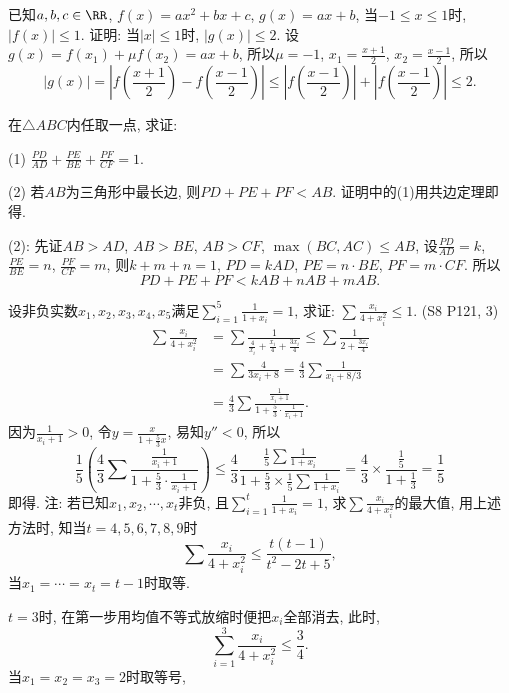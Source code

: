 \bq{}{}
已知$a,b,c\in\RR$, $f\left(x\right)=ax^{2}+bx+c$, $g\left(x\right)=ax+b$,
当$-1\le x\le1$时, $\left|f\left(x\right)\right|\le1$. 证明: 当$\left|x\right|\le1$时,
$\left|g\left(x\right)\right|\le2$.
\eq
\ba
设$g\left(x\right)=f\left(x_{1}\right)+\mu f\left(x_{2}\right)=ax+b$,
所以$\mu=-1$, $x_{1}=\frac{x+1}{2}$, $x_{2}=\frac{x-1}{2}$, 所以
\[
\left|g\left(x\right)\right|=\left|f\left(\frac{x+1}{2}\right)-f\left(\frac{x-1}{2}\right)\right|\le\left|f\left(\frac{x-1}{2}\right)\right|+\left|f\left(\frac{x-1}{2}\right)\right|\le2.
\]
\ea

\bq{}{}
在$\triangle ABC$内任取一点, 求证:

(1) $\frac{PD}{AD}+\frac{PE}{BE}+\frac{PF}{CF}=1$.

(2) 若$AB$为三角形中最长边, 则$PD+PE+PF<AB$.
\eq
\ba
证明中的(1)用共边定理即得.

(2): 先证$AB>AD$, $AB>BE$, $AB>CF$, $\max\left(BC,AC\right)\le AB$,
设$\frac{PD}{AD}=k$, $\frac{PE}{BE}=n$, $\frac{PF}{CF}=m$, 则$k+m+n=1$,
$PD=kAD$, $PE=n\cdot BE$, $PF=m\cdot CF$. 所以
\[
PD+PE+PF<kAB+nAB+mAB.
\]
\ea

\bq{}{}
设非负实数$x_{1},x_{2},x_{3},x_{4},x_{5}$满足$\sum_{i=1}^{5}\frac{1}{1+x_{i}}=1$,
求证: $\sum\frac{x_{i}}{4+x_{i}^{2}}\le1$. (S8 P121, 3)
\eq
\ba
\[
\begin{aligned}\sum\frac{x_{i}}{4+x_{i}^{2}} & =\sum\frac{1}{\frac{4}{x_{i}}+\frac{x_{i}}{4}+\frac{3x_{i}}{4}}\le\sum\frac{1}{2+\frac{3x_{i}}{4}}\\
 & =\sum\frac{4}{3x_{i}+8}=\frac{4}{3}\sum\frac{1}{x_{i}+8/3}\\
 & =\frac{4}{3}\sum\frac{\frac{1}{x_{i}+1}}{1+\frac{5}{3}\cdot\frac{1}{x_{i}+1}}.
\end{aligned}
\]
因为$\frac{1}{x_{i}+1}>0$, 令$y=\frac{x}{1+\frac{5}{3}x}$, 易知$y''<0$,
所以
\[
\frac{1}{5}\left(\frac{4}{3}\sum\frac{\frac{1}{x_{i}+1}}{1+\frac{5}{3}\cdot\frac{1}{x_{i}+1}}\right)\le\frac{4}{3}\frac{\frac{1}{5}\sum\frac{1}{1+x_{i}}}{1+\frac{5}{3}\times\frac{1}{5}\sum\frac{1}{1+x_{i}}}=\frac{4}{3}\times\frac{\frac{1}{5}}{1+\frac{1}{3}}=\frac{1}{5}
\]
即得.
\ea
注: 若已知$x_{1},x_{2},\cdots,x_{t}$非负, 且$\sum_{i=1}^{t}\frac{1}{1+x_{i}}=1$,
求$\sum\frac{x_{i}}{4+x_{i}^{2}}$的最大值, 用上述方法时, 知当$t=4,5,6,7,8,9$时
\[
\sum\frac{x_{i}}{4+x_{i}^{2}}\le\frac{t\left(t-1\right)}{t^{2}-2t+5},
\]
当$x_{1}=\cdots=x_{t}=t-1$时取等.

$t=3$时, 在第一步用均值不等式放缩时便把$x_{i}$全部消去, 此时,
\[
\sum_{i=1}^{3}\frac{x_{i}}{4+x_{i}^{2}}\le\frac{3}{4}.
\]
当$x_{1}=x_{2}=x_{3}=2$时取等号, 

